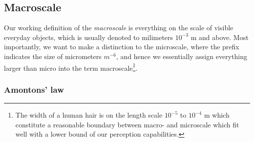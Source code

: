 









\subsection{Macroscale}

Our working definition of the \textit{macroscale} is everything on the scale of visible everyday objects, which is usually denoted to milimeters $10^{-3}$ m and above. Most importantly, we want to make a distinction to the microscale, where the prefix indicates the size of micrometers $m^{-6}$, and hence we essentially assign everything larger than micro into the term macroscale\footnote{The width of a human hair is on the length scale $10^{-5}$ to $10^{-4}$ m which constitute a reasonable boundary between macro- and microscale which fit well with a lower bound of our perception capabilities.}.

\subsubsection{Amontons’ law}
 
